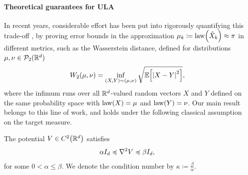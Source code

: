 \documentclass[11pt,a4paper]{article}
\begin{document}
    \paragraph{Theoretical guarantees for ULA}
	In recent years,  considerable effort has been put into rigorously quantifying this trade-off \cite{Chewi26Book}, by proving error bounds in the approximation $\mu_k \coloneqq \law\tond*{\hatx_k} \approx \pi$ in different metrics, such as 
    the Wasserstein distance, defined for distributions $\mu,\nu \in \mathcal{P}_2(\mathbb{R}^d)$ 
    \[
    W_2(\mu,\nu) = \inf_{(X,Y)\sim (\mu,\nu)} \sqrt{\expe{\abs*{X-Y}^2}},
    \]
    where the infimum runs over 
	all $\mathbb{R}^{d}$-valued random vectors 
	$X$ and $Y$
	defined on the same probability space with
	$\operatorname{law}(X) = \mu$ and $\operatorname{law}(Y) = \nu$.
    Our main result belongs to this line of work, and holds under the following classical assumption on the target measure.
    \begin{assumption}\label{ass:strong-log-conc-log-smooth}
		The potential $V\in C^2\tond*{\R^d}$ satisfies 
		\[
		\alpha I_d \preccurlyeq \nabla^2 V \preccurlyeq \beta I_d,
		\]
		for some $0<\alpha \leq\beta$. We denote the condition number by $\kappa \coloneqq \frac{\beta}{\alpha}$. 
	\end{assumption}
\end{document}
